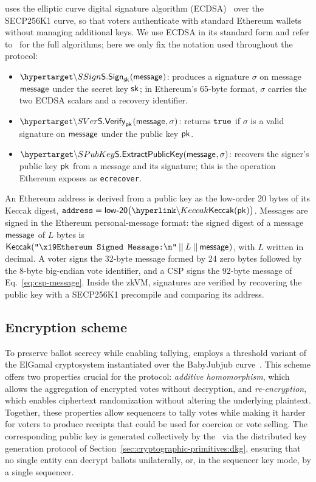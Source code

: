 \Davinci uses the elliptic curve digital signature algorithm (ECDSA)~\cite{johnson2001ecdsa} over the SECP256K1 curve, so that voters authenticate with standard Ethereum wallets without managing additional keys. We use ECDSA in its standard form and refer to~\cite{johnson2001ecdsa} for the full algorithms; here we only fix the notation used throughout the protocol:
\begin{itemize}
	\item $\hlset{\SSign}_{\sk}(\msg)$: produces a signature $\sigma$ on message ${\sf{message}^{}}$ under the secret key ${\sf{sk}^{}}$; in Ethereum's 65-byte format, $\sigma$ carries the two ECDSA scalars and a recovery identifier.
	\item $\hlset{\SVer}_{\pk}(\msg, \sigma)$: returns $\texttt{true}$ if $\sigma$ is a valid signature on ${\sf{message}^{}}$ under the public key ${\sf{pk}^{}}$.
	\item $\hlset{\SPubKey}(\msg, \sigma)$: recovers the signer's public key ${\sf{pk}^{}}$ from a message and its signature; this is the operation Ethereum exposes as \texttt{ecrecover}.
\end{itemize}
An Ethereum address is derived from a public key as the low-order 20 bytes of its Keccak digest, $\address = \mathsf{low\text{-}20}\bigl(\hlget{\Keccak}(\pk)\bigr)$. Messages are signed in the Ethereum personal-message format: the signed digest of a message ${\sf{message}^{}}$ of $L$ bytes is ${\sf{Keccak}}(\texttt{"\textbackslash x19Ethereum Signed Message:\textbackslash n"} \:||\: L \:||\: {\sf{message}^{}})$, with $L$ written in decimal. A voter signs the 32-byte message formed by 24 zero bytes followed by the 8-byte big-endian vote identifier, and a \ac{CSP} signs the 92-byte message of Eq.~\eqref{eq:csp-message}. Inside the \ac{zkVM}, signatures are verified by recovering the public key with a SECP256K1 precompile and comparing its address.

\subsection{Encryption scheme}
\label{sec:cryptographic-primitives:encryption}

To preserve ballot secrecy while enabling tallying, \davinci employs a threshold variant of the ElGamal cryptosystem instantiated over the BabyJubjub curve~\cite{sutikno1998implementation}. This scheme offers two properties crucial for the protocol: \emph{additive homomorphism}, which allows the aggregation of encrypted votes without decryption, and \emph{re-encryption}, which enables ciphertext randomization without altering the underlying plaintext. Together, these properties allow sequencers to tally votes while making it harder for voters to produce receipts that could be used for coercion or vote selling. The corresponding public key is generated collectively by the \keywardens\ via the distributed key generation protocol of Section~\ref{sec:cryptographic-primitives:dkg}, ensuring that no single entity can decrypt ballots unilaterally, or, in the sequencer key mode, by a single sequencer.

